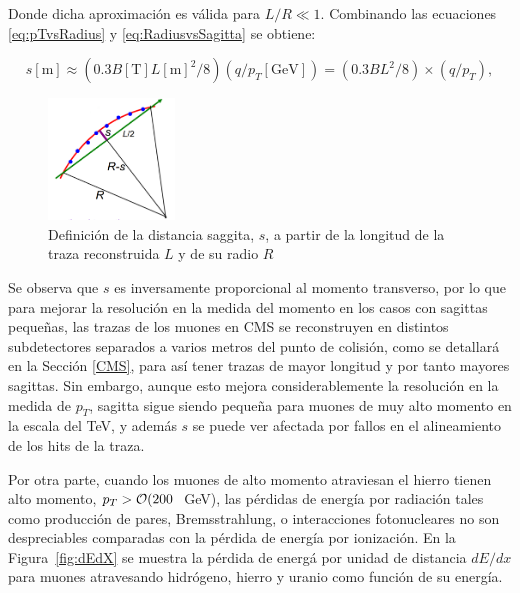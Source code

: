 Donde dicha aproximaci\'on es v\'alida para $L/R \ll 1$. Combinando las ecuaciones \eqref{eq:pTvsRadius} y \eqref{eq:RadiusvsSagitta} se obtiene:

\begin{equation}
  s[\text{m}]\approx (0.3 B [\text{T}] L[\text{m}]^{2}/8) (q/p_{T}[\text{GeV}]) =  (0.3 BL^{2}/8) \times (q/p_{T}),
\label{eq:SagittavsPt}
\end{equation}

\begin{figure}
\centering
\includegraphics[width=0.30\textwidth]{figures/curvaturesketch.png}
\caption{Definici\'on de la distancia saggita, $s$, a partir de la longitud de la traza reconstruida $L$ y de su radio $R$}
\label{fig:SagittaDef}
\end{figure}

Se observa que $s$ es inversamente proporcional al momento transverso, por lo que para mejorar la resoluci\'on en la medida del momento en los casos con sagittas pequeñas, las trazas de los muones en CMS se reconstruyen en distintos subdetectores separados a varios metros del punto de colisi\'on, como se detallar\'a en la Secci\'on \ref{CMS}, para as\'i tener trazas de mayor longitud y por tanto mayores sagittas. Sin embargo, aunque esto mejora considerablemente la resoluci\'on en la medida de $p_{T}$, sagitta sigue siendo pequeña para muones de muy alto momento en la escala del TeV, y adem\'as $s$ se puede ver afectada por fallos en el alineamiento de los hits de la traza.

Por otra parte, cuando los muones de alto momento atraviesan el hierro tienen alto momento, $p_{T} > {\cal O}(200~$ GeV), las p\'erdidas de energ\'ia por radiaci\'on tales como producci\'on de pares, Bremsstrahlung, o interacciones fotonucleares no son despreciables comparadas con la p\'erdida de energ\'ia por ionizaci\'on. En la Figura~\ref{fig:dEdX} se muestra la p\'erdida de energ\'a  por unidad de distancia $dE/dx$ para muones atravesando hidr\'ogeno, hierro y uranio como funci\'on de su energ\'ia.

